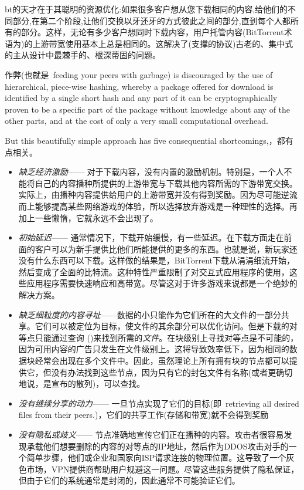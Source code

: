 bt的天才在于其聪明的资源优化\cite{cohen2003incentives}:如果很多客户想从您下载相同的内容,给他们的不同部分,在第二个阶段,让他们交换以牙还牙的方式彼此之间的部分,直到每个人都所有的部分。这样，无论有多少客户想同时下载内容，用户托管内容(BitTorrent术语为)的上游带宽使用基本上总是相同的。这解决了(支撑的协议)古老的、集中式的主从设计中最棘手的、根深蒂固的问题。

作弊(也就是\ feeding your peers with garbage) is discouraged by the use of hierarchical, piece-wise hashing, whereby a package offered for download is identified by a single short hash and any part of it can be cryptographically proven to be a specific part of the package without knowledge about any of the other parts, and at the cost of only a very small computational overhead. 

But this beautifully simple approach has five consequential shortcomings,\cite{locher2006free,piatek2007incentives}，都有点相关。

\begin{itemize}
\item \emph{缺乏经济激励}——
对于下载内容，没有内置的激励机制。特别是，一个人不能将自己的内容播种所提供的上游带宽与下载其他内容所需的下游带宽交换。实际上，由播种内容提供给用户的上游带宽并没有得到奖励。因为尽可能逆流而上能够提高某些网络游戏的体验，所以选择放弃游戏是一种理性的选择。再加上一些懒惰，它就永远不会出现了。

\item \emph{初始延迟}——
通常情况下，下载开始缓慢，有一些延迟。在下载方面走在前面的客户可以为新手提供比他们所能提供的更多的东西。也就是说，新玩家还没有什么东西可以下载。这样做的结果是，BitTorrent下载从涓涓细流开始，然后变成了全面的比特流。这种特性严重限制了对交互式应用程序的使用，这些应用程序需要快速响应和高带宽。尽管这对于许多游戏来说都是一个绝妙的解决方案。
 
\item \emph{缺乏细粒度的内容寻址}——数据的小只能作为它们所在的大文件的一部分共享。它们可以被定位为目标，使文件的其余部分可以优化访问。但是下载的对等点只能通过查询 ()来找到所需的\emph{文件}。在块级别上寻找对等点是不可能的，因为可用内容的广告只发生在文件级别上。这将导致效率低下，因为相同的数据块经常会出现在多个文件中。因此，虽然理论上所有拥有块的节点都可以提供它，但没有办法找到这些节点，因为只有它的封包文件有名称(或者更确切地说，是宣布的散列)，可以查找。

\item \emph{没有继续分享的动力}——
一旦节点实现了它们的目标(即\ retrieving all desired files from their peers.)，它们的共享工作(存储和带宽)就不会得到奖励\item \emph{没有隐私或歧义}——
节点准确地宣传它们正在播种的内容。攻击者很容易发现承载他们想要删除的内容的对等点的IP地址，然后作为DDOS攻击对手的一个简单步骤，他们或企业和国家向ISP请求连接的物理位置。这导致了一个灰色市场，VPN提供商帮助用户规避这一问题。尽管这些服务提供了隐私保证，但由于它们的系统通常是封闭的，因此通常不可能验证它们。 
\end{itemize}

